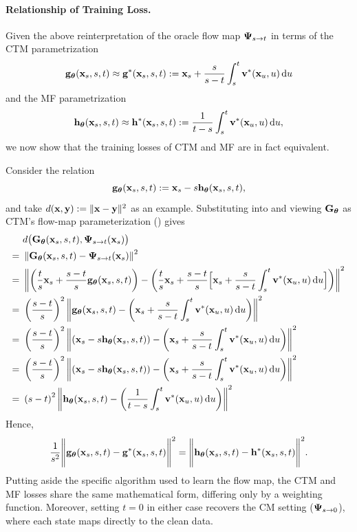 \paragraph{Relationship of Training Loss.} Given the above reinterpretation of the oracle flow map ${\bm{\Psi}}_{s\to t}$ in terms of the CTM parametrization 
\[
{\mathbf{g}}_{\bm{\theta}}({\mathbf{x}}_s,s,t) \approx {\mathbf{g}}^*({\mathbf{x}}_s,s,t):={\mathbf{x}}_s + \frac{s}{s-t}\int_s^t {\mathbf{v}}^*({\mathbf{x}}_u,u) \mathop{}\!\mathrm{d} u
\]
 and the MF parametrization 
\[
{\mathbf{h}}_{\bm{\theta}}({\mathbf{x}}_s,s,t) \approx {\mathbf{h}}^*({\mathbf{x}}_s,s,t):=\frac{1}{t-s}\int_s^t {\mathbf{v}}^*({\mathbf{x}}_u,u) \mathop{}\!\mathrm{d} u,
\] 
we now show that the training losses of CTM and MF are in fact equivalent.


Consider the relation
\[
{\mathbf{g}}_{\bm{\theta}}({\mathbf{x}}_s,s,t) := {\mathbf{x}}_s - s {\mathbf{h}}_{\bm{\theta}}({\mathbf{x}}_s,s,t),
\]
and take $d({\mathbf{x}},{\mathbf{y}}):=\|{\mathbf{x}}-{\mathbf{y}}\|^2$ as an example. Substituting into  and viewing ${\mathbf{G}}_{\bm{\theta}}$ as CTM’s flow-map parameterization () gives
\begin{align} &~d\big({\mathbf{G}}_{\bm{\theta}}({\mathbf{x}}_s,s,t), {\bm{\Psi}}_{s\to t}({\mathbf{x}}_s)\big) \notag \\ = &~\left\lVert{\mathbf{G}}_{\bm{\theta}}({\mathbf{x}}_s,s,t) - {\bm{\Psi}}_{s\to t}({\mathbf{x}}_s)\right\rVert^2 \notag \\ = &~\left\lVert\left(\frac{t}{s}{\mathbf{x}}_s + \frac{s-t}{s} {\mathbf{g}}_{\bm{\theta}}({\mathbf{x}}_s,s,t)\right)-\left(\frac{t}{s}{\mathbf{x}}_s + \frac{s-t}{s}\Big[{\mathbf{x}}_s + \frac{s}{s-t}\int_s^t {\mathbf{v}}^*({\mathbf{x}}_u,u) \mathop{}\!\mathrm{d} u\Big]\right)\right\rVert^2 \notag \\ = &~\left(\frac{s-t}{s}\right)^2\left\lVert{\mathbf{g}}_{\bm{\theta}}({\mathbf{x}}_s,s,t)-\left({\mathbf{x}}_s + \frac{s}{s-t}\int_s^t {\mathbf{v}}^*({\mathbf{x}}_u,u) \mathop{}\!\mathrm{d} u\right)\right\rVert^2 \label{eq:g-para} \\ = &~\left(\frac{s-t}{s}\right)^2\left\lVert\left({\mathbf{x}}_s - s {\mathbf{h}}_{\bm{\theta}}({\mathbf{x}}_s,s,t)\right)-\left({\mathbf{x}}_s + \frac{s}{s-t}\int_s^t {\mathbf{v}}^*({\mathbf{x}}_u,u) \mathop{}\!\mathrm{d} u\right)\right\rVert^2 \notag \\ = &~\left(\frac{s-t}{s}\right)^2\left\lVert\left({\mathbf{x}}_s - s {\mathbf{h}}_{\bm{\theta}}({\mathbf{x}}_s,s,t)\right)-\left({\mathbf{x}}_s + \frac{s}{s-t}\int_s^t {\mathbf{v}}^*({\mathbf{x}}_u,u) \mathop{}\!\mathrm{d} u\right)\right\rVert^2 \notag \\ = &~\left(s-t\right)^2\left\lVert {\mathbf{h}}_{\bm{\theta}}({\mathbf{x}}_s,s,t)- \left(\frac{1}{t-s}\int_s^t {\mathbf{v}}^*({\mathbf{x}}_u,u)\mathop{}\!\mathrm{d} u \right)\right\rVert^2 \label{eq:h-para} \end{align}
Hence,
\begin{align*} 
\frac{1}{s^2} \Bigg\|{\mathbf{g}}_{\bm{\theta}}({\mathbf{x}}_s,s,t)-{\mathbf{g}}^*({\mathbf{x}}_s,s,t) \Bigg\|^2 = \Bigg\|{\mathbf{h}}_{\bm{\theta}}({\mathbf{x}}_s,s,t)-{\mathbf{h}}^*({\mathbf{x}}_s,s,t) \Bigg\|^2. 
\end{align*}
Putting aside the specific algorithm used to learn the flow map, the CTM and MF losses share the same mathematical form, differing only by a weighting function. Moreover, setting $t=0$ in either case recovers the CM setting (${\bm{\Psi}}_{s\to 0}$), where
each state maps directly to the clean data.


